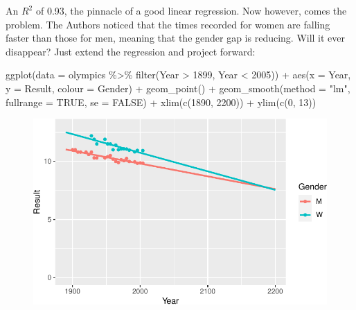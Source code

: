\documentclass[
  letterpaper,
  DIV=11,
  numbers=noendperiod]{scrreprt}
\newenvironment{Shaded}{\begin{snugshade}}{\end{snugshade}}
\newcommand{\AttributeTok}[1]{\textcolor[rgb]{0.40,0.45,0.13}{#1}}
\newcommand{\ConstantTok}[1]{\textcolor[rgb]{0.56,0.35,0.01}{#1}}
\newcommand{\DecValTok}[1]{\textcolor[rgb]{0.68,0.00,0.00}{#1}}
\newcommand{\FunctionTok}[1]{\textcolor[rgb]{0.28,0.35,0.67}{#1}}
\newcommand{\NormalTok}[1]{\textcolor[rgb]{0.00,0.23,0.31}{#1}}
\newcommand{\SpecialCharTok}[1]{\textcolor[rgb]{0.37,0.37,0.37}{#1}}
\newcommand{\StringTok}[1]{\textcolor[rgb]{0.13,0.47,0.30}{#1}}
\begin{document}
An \(R^2\) of 0.93, the pinnacle of a good linear regression. Now
however, comes the problem. The Authors noticed that the times recorded
for women are falling faster than those for men, meaning that the gender
gap is reducing. Will it ever disappear? Just extend the regression and
project forward:

\begin{Shaded}
\begin{Highlighting}[]
\FunctionTok{ggplot}\NormalTok{(}\AttributeTok{data =}\NormalTok{ olympics }\SpecialCharTok{\%\textgreater{}\%} \FunctionTok{filter}\NormalTok{(Year }\SpecialCharTok{\textgreater{}} \DecValTok{1899}\NormalTok{, Year }\SpecialCharTok{\textless{}} \DecValTok{2005}\NormalTok{)) }\SpecialCharTok{+} 
  \FunctionTok{aes}\NormalTok{(}\AttributeTok{x =}\NormalTok{ Year, }\AttributeTok{y =}\NormalTok{ Result, }\AttributeTok{colour =}\NormalTok{ Gender) }\SpecialCharTok{+} 
  \FunctionTok{geom\_point}\NormalTok{() }\SpecialCharTok{+} \FunctionTok{geom\_smooth}\NormalTok{(}\AttributeTok{method =} \StringTok{"lm"}\NormalTok{, }\AttributeTok{fullrange =} \ConstantTok{TRUE}\NormalTok{, }\AttributeTok{se =} \ConstantTok{FALSE}\NormalTok{) }\SpecialCharTok{+}
  \FunctionTok{xlim}\NormalTok{(}\FunctionTok{c}\NormalTok{(}\DecValTok{1890}\NormalTok{, }\DecValTok{2200}\NormalTok{)) }\SpecialCharTok{+} \FunctionTok{ylim}\NormalTok{(}\FunctionTok{c}\NormalTok{(}\DecValTok{0}\NormalTok{, }\DecValTok{13}\NormalTok{))}
\end{Highlighting}
\end{Shaded}

\begin{figure}[H]

{\centering \includegraphics{./08-linearreg_files/figure-pdf/unnamed-chunk-19-1.pdf}

}

\end{figure}
\end{document}
